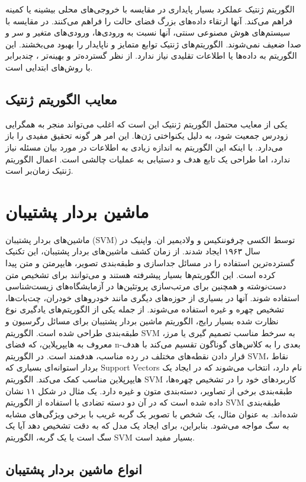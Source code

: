 \documentclass{CSICC2020}
\begin{document}
 الگوریتم ژنتیک عملکرد بسیار پایداری در مقایسه با خروجی‌های محلی بیشینه یا کمینه فراهم می‌کند. 
 آنها ارتقاء داده‌های بزرگ فضای حالت را فراهم می‌کنند. 
 در مقایسه با سیستم‌های هوش مصنوعی سنتی، آنها نسبت به ورودی‌ها، ورودی‌های متغیر و سر و صدا ضعیف نمی‌شوند. 
 الگوریتم‌های ژنتیک توابع متمایز و ناپایدار را بهبود می‌بخشند. 
 این الگوریتم به داده‌ها یا اطلاعات تقلیدی نیاز ندارد. 
 از نظر گسترده‌تر و بهینه‌تر ، چندبرابر با روش‌های ابتدایی است. 
\subsection{معایب الگوریتم ژنتیک}

 یکی از معایب محتمل الگوریتم ژنتیک این است که اغلب می‌تواند منجر به همگرایی زودرس جمعیت شود، به دلیل یکنواختی ژن‌ها. این امر هر گونه تحقیق مفیدی را باز می‌دارد. 
 با اینکه این الگوریتم به اندازه زیادی به اطلاعات در مورد بیان مسئله نیاز ندارد، اما طراحی یک تابع هدف و دستیابی به عملیات چالشی است. 
 اعمال الگوریتم ژنتیک زمان‌بر است. 

\section{ماشین بردار پشتیبان}
ماشین‌های بردار پشتیبان (SVM) توسط الکسی چرفوننکیس و ولادیمیر ان. واپنیک در سال ۱۹۶۳ ایجاد شدند. از زمان کشف ماشین‌های بردار پشتیبان، این تکنیک گسترده‌ترین استفاده را در مسائل جداسازی و طبقه‌بندی تصویر، هایپرمتن و متن پیدا کرده است. این الگوریتم‌ها بسیار پیشرفته هستند و می‌توانند برای تشخیص متن دست‌نوشته و همچنین برای مرتب‌سازی پروتئین‌ها در آزمایشگاه‌های زیست‌شناسی استفاده شوند. آنها در بسیاری از حوزه‌های دیگری مانند خودروهای خودران، چت‌بات‌ها، تشخیص چهره و غیره استفاده می‌شوند. از جمله یکی از الگوریتم‌های یادگیری نوع نظارت شده بسیار رایج، الگوریتم ماشین بردار پشتیبان برای مسائل رگرسیون و طبقه‌بندی طراحی شده است. الگوریتم SVM به سرخط مناسب تصمیم گیری یا مرز، معروف به هایپرپلاین، که فضای n-بعدی را به کلاس‌های گوناگون تقسیم می‌کند با هدف قرار دادن نقطه‌های مختلف در رده مناسب، هدفمند است. در الگوریتم SVM، نقاط بردار استوانه‌ای بسیاری که Support Vectors نام دارد، انتخاب می‌شوند که در ایجاد یک هایپرپلاین مناسب کمک می‌کند. الگوریتم SVM کاربردهای خود را در تشخیص چهره‌ها، طبقه‌بندی برخی از تصاویر، دسته‌بندی متون و غیره دارد. یک مثال در شکل ۱۱ نشان داده شده است که در آن دو دسته تضادی با استفاده از الگوریتم SVM طبقه‌بندی شده‌اند. به عنوان مثال، یک شخص با تصویر یک گربه غریب با برخی ویژگی‌های مشابه به سگ مواجه می‌شود. بنابراین، برای ایجاد یک مدل که به دقت تشخیص دهد آیا یک سگ است یا یک گربه، الگوریتم SVM بسیار مفید است. ‌
\subsection{انواع ماشین بردار پشتیبان}
\end{document}
